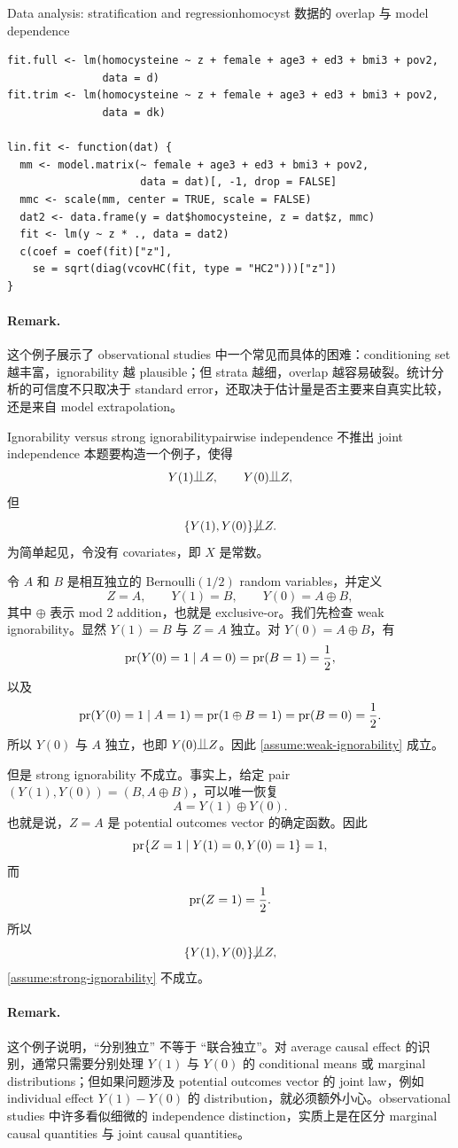 \begin{exercisesolution}{Data analysis: stratification and regression}{homocyst 数据的 overlap 与 model dependence}
\begin{lstlisting}
fit.full <- lm(homocysteine ~ z + female + age3 + ed3 + bmi3 + pov2,
               data = d)
fit.trim <- lm(homocysteine ~ z + female + age3 + ed3 + bmi3 + pov2,
               data = dk)

lin.fit <- function(dat) {
  mm <- model.matrix(~ female + age3 + ed3 + bmi3 + pov2,
                     data = dat)[, -1, drop = FALSE]
  mmc <- scale(mm, center = TRUE, scale = FALSE)
  dat2 <- data.frame(y = dat$homocysteine, z = dat$z, mmc)
  fit <- lm(y ~ z * ., data = dat2)
  c(coef = coef(fit)["z"],
    se = sqrt(diag(vcovHC(fit, type = "HC2")))["z"])
}
\end{lstlisting}

\paragraph{Remark.}
这个例子展示了 observational studies 中一个常见而具体的困难：conditioning set 越丰富，ignorability 越 plausible；但 strata 越细，overlap 越容易破裂。统计分析的可信度不只取决于 standard error，还取决于估计量是否主要来自真实比较，还是来自 model extrapolation。
\end{exercisesolution}

\begin{exercisesolution}{Ignorability versus strong ignorability}{pairwise independence 不推出 joint independence}
本题要构造一个例子，使得
\[
Y(1)\ind Z,\qquad Y(0)\ind Z,
\]
但
\[
\{Y(1),Y(0)\}\nind Z.
\]
为简单起见，令没有 covariates，即 $X$ 是常数。

令 $A$ 和 $B$ 是相互独立的 Bernoulli$(1/2)$ random variables，并定义
\[
Z=A,\qquad Y(1)=B,\qquad Y(0)=A\oplus B,
\]
其中 $\oplus$ 表示 mod 2 addition，也就是 exclusive-or。我们先检查 weak ignorability。显然 $Y(1)=B$ 与 $Z=A$ 独立。对 $Y(0)=A\oplus B$，有
\[
\textup{pr}(Y(0)=1\mid A=0)=\textup{pr}(B=1)=\frac{1}{2},
\]
以及
\[
\textup{pr}(Y(0)=1\mid A=1)=\textup{pr}(1\oplus B=1)=\textup{pr}(B=0)=\frac{1}{2}.
\]
所以 $Y(0)$ 与 $A$ 独立，也即 $Y(0)\ind Z$。因此 \cref{assume:weak-ignorability} 成立。

但是 strong ignorability 不成立。事实上，给定 pair $(Y(1),Y(0))=(B,A\oplus B)$，可以唯一恢复
\[
A=Y(1)\oplus Y(0).
\]
也就是说，$Z=A$ 是 potential outcomes vector 的确定函数。因此
\[
\textup{pr}\{Z=1\mid Y(1)=0,Y(0)=1\}=1,
\]
而
\[
\textup{pr}(Z=1)=\frac{1}{2}.
\]
所以
\[
\{Y(1),Y(0)\}\nind Z,
\]
\cref{assume:strong-ignorability} 不成立。

\paragraph{Remark.}
这个例子说明，``分别独立'' 不等于 ``联合独立''。对 average causal effect 的识别，通常只需要分别处理 $Y(1)$ 与 $Y(0)$ 的 conditional means 或 marginal distributions；但如果问题涉及 potential outcomes vector 的 joint law，例如 individual effect $Y(1)-Y(0)$ 的 distribution，就必须额外小心。observational studies 中许多看似细微的 independence distinction，实质上是在区分 marginal causal quantities 与 joint causal quantities。
\end{exercisesolution}
